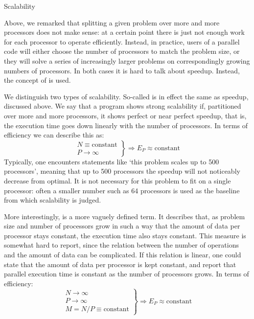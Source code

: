 
 {Scalability}
\label{sec:scaling}

Above, we remarked that splitting a given problem over more and more
processors does not make sense: at a certain point there is just not
enough work for each processor to operate efficiently. Instead, in
practice, users of a parallel code will either choose the number of
processors to match the problem size, or they will solve a series of
increasingly larger problems on correspondingly growing numbers of
processors. In both cases it is hard to talk about speedup. Instead,
the concept of  is used.

We distinguish two types of scalability. So-called
 is in effect the same as speedup,
discussed above. We say that a program shows strong scalability if,
partitioned over more and more processors, it shows perfect or near
perfect speedup, that is, the execution time goes down linearly with
the number of processors. In terms of efficiency we can describe this
as:
\[ \left.
\begin{array}{l}
  N\equiv\mathrm{constant}\\ P\rightarrow\infty
\end{array}
\right\} \Rightarrow E_P\approx\mathrm{constant}
\]
Typically, one encounters statements like `this
problem scales up to 500 processors', meaning that up to 500
processors the speedup will not noticeably decrease from optimal. It
is not necessary for this problem to fit on a single processor: often
a smaller number such as 64 processors is used as the baseline from
which scalability is judged.

More interestingly,  is a more vaguely
defined term. It describes that, as problem size and number of
processors grow in such a way that the amount of data per processor
stays constant, the execution time
also stays constant.
This measure is somewhat hard to report, since
the relation between the number of operations and the amount of data
can be complicated. If this relation is linear, one could state that
the amount of data per processor is kept constant, and report that parallel
execution time is constant as the number of processors grows.
In terms of efficiency:
\[ \left.
\begin{array}{l}
  N\rightarrow\infty\\ P\rightarrow\infty\\ M=N/P\equiv\mathrm{constant}
\end{array}
\right\} \Rightarrow E_P\approx\mathrm{constant}
\]

